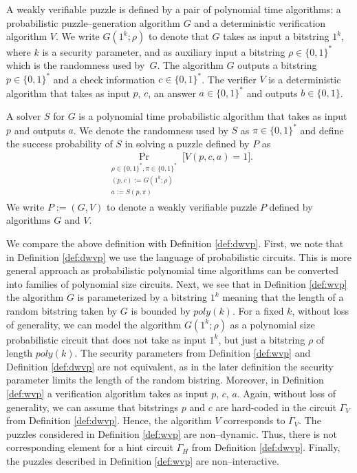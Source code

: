 \begin{definition}
  \label{def:wvp}
A \textnormal{weakly verifiable puzzle} is defined by a pair of polynomial time algorithms:
a probabilistic puzzle--generation algorithm $G$ and a deterministic verification algorithm $V$.
We write $G(1^k; \rho)$ to denote that $G$ takes as input a bitstring $1^k$, where $k$ is a security parameter,
and as auxiliary input a bitstring $\rho \in \{0,1\}^{*}$ which is the randomness used by~$G$.
The algorithm $G$ outputs a bitstring $p \in \{0,1\}^{*}$ and a check information $c \in \{0,1\}^{*}$.
The \textnormal{verifier} $V$ is a deterministic algorithm that takes as input $p$, $c$, an answer $a \in \{0,1\}^{*}$
and outputs $b \in \{0,1\}$.

A \textnormal{solver} $S$ for $G$ is a polynomial time probabilistic algorithm that
takes as input $p$ and outputs $a$. We denote the randomness used by $S$ as $\pi \in \{0,1\}^{*}$
and define the \textnormal{success probability} of $S$ in solving a puzzle defined by $P$ as
\begin{align*}
  \underset{\substack{\rho \in \{0,1\}^{*}, \pi \in \{0,1\}^{*} \\ (p,c):=G(1^k; \rho) \\ a := S(p, \pi)}}{\Pr}\Big[ V(p,c,a) = 1\Big].
\end{align*}
We write $P := (G,V)$ to denote a weakly verifiable puzzle $P$ defined by algorithms $G$ and $V$.
\end{definition}
We compare the above definition with Definition \ref{def:dwvp}.
First, we note that in Definition \ref{def:dwvp} we use the language of probabilistic circuits. This is more general approach
as probabilistic polynomial time algorithms can be converted into families of polynomial size circuits.
Next, we see that in Definition \ref{def:wvp} the algorithm $G$ is parameterized by
a bitstring $1^k$ meaning that the length of a random bitstring taken by $G$ is bounded by $poly(k)$.
For a fixed $k$, without loss of generality, we can model the algorithm $G(1^k; \rho)$ as a polynomial size probabilistic circuit
that does not take as input $1^k$, but just a bitstring $\rho$ of length $\mathit{poly}(k)$.
The security parameters from Definition \ref{def:wvp} and Definition \ref{def:dwvp} are not equivalent,
as in the later definition the security parameter limits the length of the random bistring.
Moreover, in Definition \ref{def:wvp} a verification algorithm takes as input $p$, $c$, $a$.
Again, without loss of generality, we can assume that bitstrings $p$ and $c$ are hard-coded
in the circuit $\Gamma_V$ from Definition \ref{def:dwvp}. Hence, the algorithm $V$ corresponds to $\Gamma_V$.
The puzzles considered in Definition \ref{def:wvp} are non--dynamic. Thus, there is not corresponding
element for a hint circuit $\Gamma_H$ from Definition \ref{def:dwvp}.
Finally, the puzzles described in Definition \ref{def:wvp} are non--interactive.

